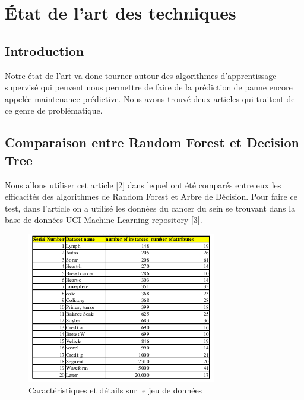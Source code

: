 \chapter{État de l'art des techniques}
\minitoc
\newpage
 
\section{Introduction}
Notre état de l'art va donc tourner autour des algorithmes d'apprentissage supervisé qui peuvent nous permettre de faire de la prédiction de panne encore appelée maintenance prédictive. Nous avons trouvé deux articles qui traitent de ce genre de problématique.

\section{Comparaison entre Random Forest et Decision Tree}
Nous allons utiliser cet article [2] dans lequel ont été comparés entre eux les efficacités des algorithmes de Random Forest et Arbre de Décision. Pour faire ce test, dans l'article on a utilisé les données du cancer du sein se trouvant dans la base de données  UCI Machine Learning repository [3]. 
\begin{figure}[h]
\begin{center}
\includegraphics[scale=1.2]{dataset.png}
\caption[Caractéristiques et détails sur le jeu de données]{Caractéristiques et détails sur le jeu de données}
\label{monlabel}
\end{center}
\end{figure}

